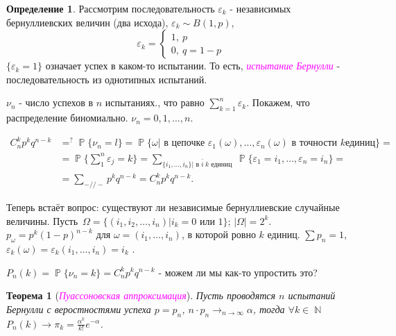 \documentclass[a4paper,100pt]{article}
\theoremstyle{indented}
\newtheorem{theorem}{Теорема}
\theoremstyle{definition}
\newtheorem{defn}{Определение}
\theoremstyle{remark}
\DeclareMathOperator{\NN}{\mathbb{N}}
\DeclareMathOperator{\PP}{\mathbb{P}}
\begin{document}
\begin{defn}
  Рассмотрим последовательность $\varepsilon_k$ - независимых бернуллиевских величин (два исхода), $\varepsilon_k\sim B(1, p)$, 
  \begin{equation*}
      \varepsilon_k=
      \begin{cases}
          1, \: p \\ 
          0, \: q=1-p
      \end{cases}
  \end{equation*}
  $\{\varepsilon_k=1\}$ означает успех в каком-то испытании. То есть, \hypertarget{n12}{\textcolor{magenta}{\textit{испытание Бернулли}}} - последовательность из однотипных испытаний.
\end{defn}

$\nu_n$ - число успехов в $n$ испытаниях., что равно $\sum_{k=1}^n\varepsilon_k$. Покажем, что распределение биномиально. $\nu_n=0, 1, \ldots, n$.

\begin{equation*} 
  \begin{aligned}
      C_n^kp^kq^{n-k} & =^?\PP\{\nu_n=l\}=\PP\{\omega\vert \text{ в цепочке }\varepsilon_1(\omega), \ldots, \varepsilon_n(\omega)\text{ в точности } k \text{единиц}\}= \\ 
      & = \PP\{\sum_1^n\varepsilon_j=k\}=\sum_{\{i_1, \ldots, i_n\}| \text{ в } \bar{i} \: k \text{ единиц }}\PP\{\varepsilon_1= i_1, \ldots, \varepsilon_n=i_n\}= \\ 
      & = \sum_{-//-}p^kq^{n-k}=C_n^k p^kq^{n-k}.
  \end{aligned}
\end{equation*} 

Теперь встаёт вопрос: существуют ли независимые бернуллиевские случайные величины. Пусть $\Omega=\{(i_1, i_2, \ldots, i_n)|i_k=0 \text{ или }1\}$; $|\Omega|=2^k$. $p_{\omega}= p^k(1-p)^{n-k}$ для $\omega=(i_1, \ldots, i_n)$, в которой ровно $k$ единиц. $\sum p_n=1$, $\varepsilon_k(\omega)=\varepsilon_k(i_1, \ldots, i_n)=i_k$ .\

$P_n(k)=\PP\{\nu_n=k\}=C_n^kp^kq^{n-k}$ - можем ли мы как-то упростить это? \\

\begin{theorem}[\hypertarget{n45}{\textcolor{magenta}{\textit{Пуассоновская аппроксимация}}}]
  Пусть проводятся $n$ испытаний Бернулли с веростностями успеха $p=p_n$, $n\cdot p_n\rightarrow_{n\rightarrow \infty} \alpha$, тогда $\forall k\in \NN$ $P_n(k)\rightarrow \pi_k=\frac{\alpha^k}{k!}e^{-\alpha}$. 
\end{theorem}
\end{document}
